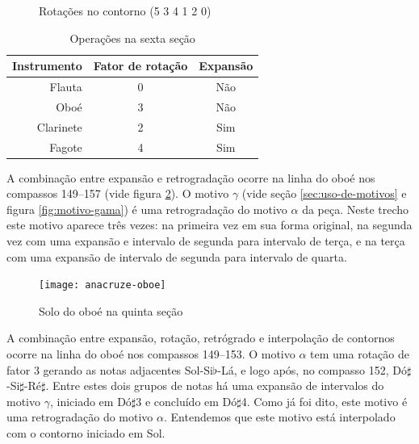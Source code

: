 \begin{figure}
  \centering
  \subfloat[Rotação 2: (4 1 2 0 5 3)]{
    \texttt{[image: c-412053]}
    \label{fig:412053}  
  }
  \subfloat[Rotação 3: (1 2 0 5 3 4)]{
    \texttt{[image: c-120534]}
    \label{fig:120534}  
  }
  \subfloat[Rotação 4: (2 0 5 3 4 1)]{
    \texttt{[image: c-205341]}
    \label{fig:205341}  
  }
  \caption{Rotações no contorno (5 3 4 1 2 0)}
  \label{fig:rotacoes-534120}
\end{figure}

\begin{table}
  \centering
  \begin{tabular}{r|cc}
    Instrumento & Fator de rotação & Expansão \\
    \hline
    Flauta & 0 & Não \\
    Oboé & 3 & Não \\
    Clarinete & 2 & Sim \\
    Fagote & 4 & Sim \\
  \end{tabular}
  \caption{Operações na sexta seção}
  \label{tab:operacoes-secao-6}
\end{table}

A combinação entre expansão e retrogradação ocorre na linha do oboé
nos compassos 149--157 (vide figura \ref{fig:oboe-solo-secao-5}). O
motivo $\gamma$ (vide seção \ref{sec:uso-de-motivos} e figura
\ref{fig:motivo-gama}) é uma retrogradação do motivo $\alpha$ da
peça. Neste trecho este motivo aparece três vezes: na primeira vez em
sua forma original, na segunda vez com uma expansão e intervalo de
segunda para intervalo de terça, e na terça com uma expansão de
intervalo de segunda para intervalo de quarta.

\begin{figure}
  \centering
  \texttt{[image: anacruze-oboe]}
  \caption{Solo do oboé na quinta seção}
  \label{fig:oboe-solo-secao-5}
\end{figure}

A combinação entre expansão, rotação, retrógrado e interpolação de
contornos ocorre na linha do oboé nos compassos 149--153. O motivo
$\alpha$ tem uma rotação de fator 3 gerando as notas adjacentes
Sol-Si$\flat$-Lá, e logo após, no compasso 152,
Dó$\sharp$-Si$\sharp$-Ré$\sharp$. Entre estes dois grupos de notas há
uma expansão de intervalos do motivo $\gamma$, iniciado em Dó$\sharp$3
e concluído em Dó$\sharp$4. Como já foi dito, este motivo é uma
retrogradação do motivo $\alpha$. Entendemos que este motivo está
interpolado com o contorno iniciado em Sol.

